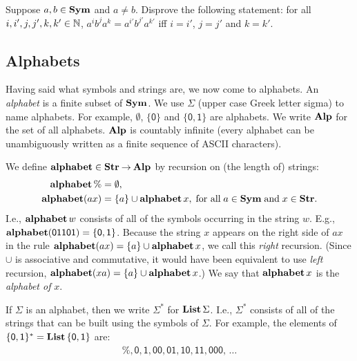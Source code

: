 \begin{exercise}
Suppose $a,b\in\mathbf{Sym}$ and $a\neq b$. Disprove the following statement:
for all $i, i', j, j', k, k'\in\mathbb{N}$, $a^i b^j a^k = a^{i'} b^{j'} a^{k'}$
iff $i = i'$, $j = j'$ and $k = k'$.
\end{exercise}

%

\subsection{Alphabets}

%
Having said what symbols and strings are, we now come to alphabets.
An \emph{alphabet}
%
is a finite subset of $\mathbf{Sym}$.  We use $\Sigma$
%
%
(upper case Greek letter sigma) to name alphabets.  For example,
$\emptyset$, $\mathsf{\{0\}}$ and $\mathsf{\{0,1\}}$ are alphabets.
We write $\mathbf{Alp}$ for the set of all alphabets.  $\mathbf{Alp}$ is countably
infinite (every alphabet can be unambiguously written as a finite
sequence of ASCII characters).
%

We define $\mathbf{alphabet}\in\mathbf{Str}\mathbin{\to}\mathbf{Alp}$
%
%
%
by recursion
%
%
%
on (the length of) strings:
\begin{align*}
\mathbf{alphabet}\,\% &= \emptyset , \\
\mathbf{alphabet}(ax) &= \{a\} \cup \mathbf{alphabet}\,x,
\;\allowbreak\mbox{for all}\allowbreak\;a\in\mathbf{Sym}\;\allowbreak\mbox{and}\allowbreak\;x\in\mathbf{Str} .
\end{align*}
I.e., $\mathbf{alphabet}\,w$ consists of all of the symbols occurring in the
string $w$.  E.g., $\mathbf{alphabet}(\mathsf{01101})=\{\mathsf{0},\mathsf{1}\}$.
Because the string $x$ appears on the right side of $ax$ in the rule
$\mathbf{alphabet}(ax) = \{a\} \cup \mathbf{alphabet}\,x$, we call this \emph{right}
recursion.  (Since $\cup$ is associative and commutative, it would
have been equivalent to use \emph{left} recursion, $\mathbf{alphabet}(xa) =
\{a\} \cup \mathbf{alphabet}\,x$.)  We say that $\mathbf{alphabet}\,x$ is the
\emph{alphabet of} $x$.

If $\Sigma$ is an alphabet, then we write $\Sigma^*$
%
%
for $\mathbf{List}\,\Sigma$.
I.e., $\Sigma^*$ consists of all of the strings that can be built
using the symbols of $\Sigma$.
For example, the elements of $\mathsf{\{0,1\}^*} = \mathbf{List}\,\mathsf{\{0,1\}}$ are:
\begin{gather*}
\%, \mathsf{0}, \mathsf{1}, \mathsf{00}, \mathsf{01}, \mathsf{10},
\mathsf{11},\mathsf{000},\, \ldots
\end{gather*}
%

